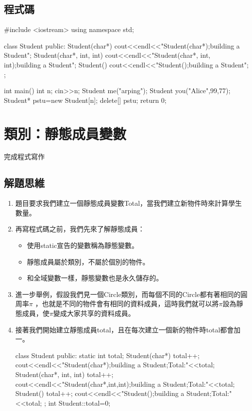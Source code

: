 \subsection{程式碼}
\begin{cppcode}
	#include <iostream>
	using namespace std;
	
	class Student{
		public:
		Student(char*) {
			cout<<endl<<"Student(char*);building a Student";
		}
		Student(char*, int, int) {
			cout<<endl<<"Student(char*, int, int);building a Student";
		}
		Student() {
			cout<<endl<<"Student();building a Student";
		}
	};
	
	int main(){
		int n;
		cin>>n;
		Student me("arping");
		Student you("Alice",99,77);
		Student* pstu=new Student[n];
		delete[] pstu;
		return 0;
	}
	
\end{cppcode}


\section{類別：靜態成員變數}
完成程式寫作

\subsection{解題思維}
	\begin{enumerate}
	\item 題目要求我們建立一個靜態成員變數Total，當我們建立新物件時來計算學生數量。
	\item 再寫程式碼之前，我們先來了解靜態成員：
	\begin{itemize}
		\item 使用static宣告的變數稱為靜態變數。
		\item 靜態成員屬於類別，不屬於個別的物件。
		\item 和全域變數一樣，靜態變數也是永久儲存的。
	\end{itemize}
	\item 進一步舉例，假設我們見一個Circle類別，而每個不同的Circle都有著相同的圓周率${\pi}$
	 ，也就是不同的物件會有相同的資料成員，這時我們就可以將${\pi}$設為靜態成員，使${\pi}$變成大家共享的資料成員。
	
	\item 接著我們開始建立靜態成員total，且在每次建立一個新的物件時total都會加一。 
	\begin{inside}
	class Student{
		public:
		static int total;
		Student(char*) {
			total++;
			cout<<endl<<"Student(char*);building a Student;Total:"<<total;
		}
		Student(char*, int, int) {
			total++;
			cout<<endl<<"Student(char*,int,int);building a Student;Total:"<<total;
		}
		Student() {
			total++;
			cout<<endl<<"Student();building a Student;Total:"<<total;
		}
	};
	int Student::total=0;
	\end{inside}
	\end{enumerate}

